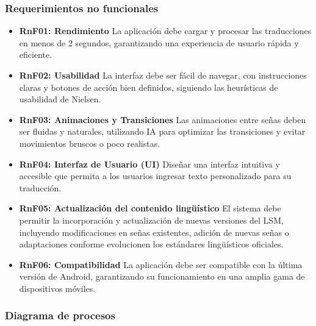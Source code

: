 \subsubsection{Requerimientos no funcionales}
\begin{itemize}
    \item \textbf{RnF01: Rendimiento}  
    La aplicación debe cargar y procesar las traducciones en menos de 2 segundos, garantizando una experiencia de usuario rápida y eficiente.
    
    \item \textbf{RnF02: Usabilidad}  
    La interfaz debe ser fácil de navegar, con instrucciones claras y botones de acción bien definidos, siguiendo las heurísticas de usabilidad de Nielsen.

	 \item \textbf{RnF03: Animaciones y Transiciones}  
    Las animaciones entre señas deben ser fluidas y naturales, utilizando IA para optimizar las transiciones y evitar movimientos bruscos o poco realistas.
    
    \item \textbf{RnF04: Interfaz de Usuario (UI)}  
    Diseñar una interfaz intuitiva y accesible que permita a los usuarios ingresar texto personalizado para su traducción.

    \item \textbf{RnF05: Actualización del contenido lingüístico}
	El sistema debe permitir la incorporación y actualización de nuevas versiones del LSM, incluyendo modificaciones en señas existentes, adición de nuevas señas o adaptaciones conforme evolucionen los estándares lingüísticos oficiales.
	\item \textbf{RnF06: Compatibilidad}  
    La aplicación debe ser compatible con la última versión de Android, garantizando su funcionamiento en una amplia gama de dispositivos móviles.
\end{itemize}

\subsubsection{Diagrama de procesos}
\begin{center}
\end{center}

